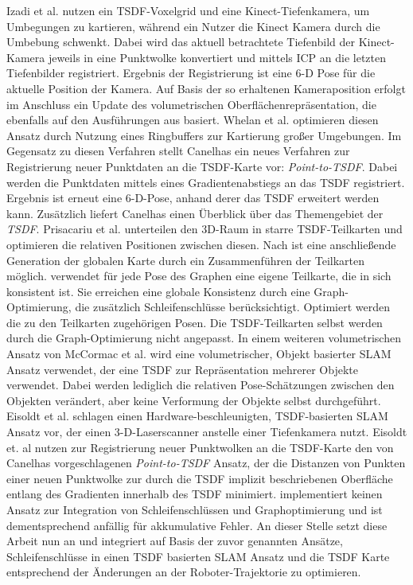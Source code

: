 Izadi et al. \cite{izadi2011kinectfusion} nutzen ein TSDF-Voxelgrid und eine Kinect-Tiefenkamera, um Umbegungen zu kartieren, während ein Nutzer die Kinect Kamera durch die Umbebung schwenkt. Dabei wird das aktuell betrachtete Tiefenbild der Kinect-Kamera jeweils in eine Punktwolke konvertiert und mittels ICP an die letzten Tiefenbilder registriert. Ergebnis der Registrierung ist eine 6-D Pose für die aktuelle Position der Kamera. Auf Basis der so erhaltenen Kameraposition erfolgt im Anschluss ein Update des volumetrischen Oberflächenrepräsentation, die ebenfalls auf den Ausführungen aus \cite{curless1996volumetric} basiert. Whelan et al. \cite{whelan2012kintinuous} optimieren diesen Ansatz durch Nutzung eines Ringbuffers zur Kartierung großer Umgebungen. Im Gegensatz zu diesen Verfahren stellt Canelhas \cite{Canelhas2017TruncatedSD} ein neues Verfahren zur Registrierung neuer Punktdaten an die TSDF-Karte vor: \emph{Point-to-TSDF}. Dabei werden die Punktdaten mittels eines Gradientenabstiegs an das TSDF registriert. Ergebnis ist erneut eine 6-D-Pose, anhand derer das TSDF erweitert werden kann. Zusätzlich liefert Canelhas \cite{Canelhas2017TruncatedSD} einen Überblick über das Themengebiet der \emph{TSDF}. Prisacariu et al. \cite{prisacariu2017infinitam} unterteilen den 3D-Raum in starre TSDF-Teilkarten und optimieren die relativen Positionen zwischen diesen. Nach \cite{prisacariu2017infinitam} ist eine anschließende Generation der globalen Karte durch ein Zusammenführen der Teilkarten möglich. \cite{prisacariu2017infinitam} verwendet für jede Pose des Graphen eine eigene Teilkarte, die in sich konsistent ist. Sie erreichen eine globale Konsistenz durch eine Graph-Optimierung, die zusätzlich Schleifenschlüsse berücksichtigt. Optimiert werden die zu den Teilkarten zugehörigen Posen. Die TSDF-Teilkarten selbst werden durch die Graph-Optimierung nicht angepasst. In einem weiteren volumetrischen Ansatz von McCormac et al. wird eine volumetrischer, Objekt basierter SLAM Ansatz verwendet, der eine TSDF zur Repräsentation mehrerer Objekte verwendet. Dabei werden lediglich die relativen Pose-Schätzungen zwischen den Objekten verändert, aber keine Verformung der Objekte selbst durchgeführt. Eisoldt et al. \cite{HATSDF} schlagen einen Hardware-beschleunigten, TSDF-basierten SLAM Ansatz vor, der einen 3-D-Laserscanner anstelle einer Tiefenkamera nutzt. Eisoldt et. al \cite{HATSDF} nutzen zur Registrierung neuer Punktwolken an die TSDF-Karte den von Canelhas \cite{Canelhas2017TruncatedSD} vorgeschlagenen \emph{Point-to-TSDF} Ansatz, der die Distanzen von Punkten einer neuen Punktwolke zur durch die TSDF implizit beschriebenen Oberfläche entlang des Gradienten innerhalb des TSDF minimiert. \cite{HATSDF} implementiert keinen Ansatz zur Integration von Schleifenschlüssen und Graphoptimierung und ist dementsprechend anfällig für akkumulative Fehler. An dieser Stelle setzt diese Arbeit nun an und integriert auf Basis der zuvor genannten Ansätze, Schleifenschlüsse in einen TSDF basierten SLAM Ansatz und die TSDF Karte entsprechend der Änderungen an der Roboter-Trajektorie zu optimieren.





